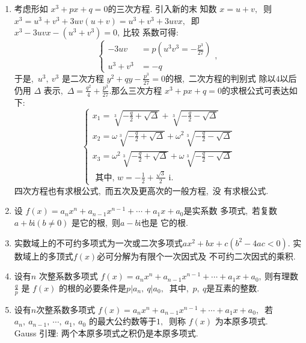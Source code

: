 \begin{enumerate}
		\item 考虑形如 $ x^{3}+p x+q=0  $的三次方程. 引入新的末 知数 $ x=u+v ,\ $ 则 $ x^{3}=u^{3}+v^{3}+3 u v(u+v)=   u^{3}+v^{3}+3 u v x ,\ $ 即  $x^{3}-3 u v x-\left(u^{3}+v^{3}\right)=0 ,\  $比较 系数可得:  
		$$\left\{\begin{aligned}
			-3 u v &=p\left(u^{3} v^{3}=-\frac{p^{3}}{27}\right) \\ u^{3}+v^{3} &=-q 
		\end{aligned}\right. ,\ $$
		于是,\   $u^{3},\  v^{3}$  是二次方程 $ y^{2}+q y-\frac{p^{3}}{27}=0  $的根,\  二次方程的判别式 除以$ 4 $以后仍用 $ \Delta $ 表示,\ $  \Delta=\frac{q^{2}}{4}+\frac{p^{3}}{27} . $那么三次方程  $x^{3}+p x+q=0  $的求根公式可表达如下:
		$$\left\{\begin{array}{l}
			x_{1}=\sqrt[3]{-\frac{q}{2}+\sqrt{\Delta}}+\sqrt[3]{-\frac{q}{2}-\sqrt{\Delta}} \\
			x_{2}=\omega \sqrt[3]{-\frac{q}{2}+\sqrt{\Delta}}+\omega^{2} \sqrt[3]{-\frac{q}{2}-\sqrt{\Delta}} \\
			x_{3}=\omega^{2} \sqrt[3]{-\frac{q}{2}+\sqrt{\Delta}}+\omega \sqrt[3]{-\frac{q}{2}-\sqrt{\Delta}} \\
			\text { 其中,\  } w=-\frac{1}{2}+\frac{\sqrt{3}}{2} \text { i. }
		\end{array}\right.$$
		四次方程也有求根公式,\  而五次及更高次的一般方程,\  没 有求根公式.
		\item 设 $ f(x)=a_{n} x^{n}+a_{n-1} x^{n-1}+\cdots+a_{1} x+a_{0}  $是实系数 多项式,\  若复数$  a+b \mathrm{i}(b \neq 0)$  是它的根,\  则$  a-b \mathrm{i}  $也是 它的根.
		\item 实数域上的不可约多项式为一次或二次多项式$  a x^{2}+   b x+c\left(b^{2}-4 a c<0\right) .$
		实数域上的多顶式$  f(x)  $必可分解为有限个一次因式及 不可约二次因式的乘积.
		\item 设有$ n $ 次整系数多项式  $f(x)=a_{n} x^{n}+a_{n-1} x^{n-1}+\cdots   +a_{1} x+a_{0} ,\  $则有理数 $ \frac{q}{p} $ 是 $ f(x) $ 的根的必要条件是$  p\left|a_{n},\  q\right| a_{0} ,\ $ 其中,\  $ p,\  q  $是互素的整数.
		\item 设有$  n  $次整系数多项式 $ f(x)=a_{n} x^{n}+a_{n-1} x^{n-1}+\cdots   +a_{1} x+a_{0} ,\ $ 若$  a_{n},\  a_{n-1},\  \cdots,\  a_{1},\  a_{0} $ 的最大公约数等于$1 ,\ $ 则称  $f(x) $ 为本原多项式.\\
		Gauss 引理: 两个本原多项式之积仍是本原多项式.
		

\end{enumerate}
